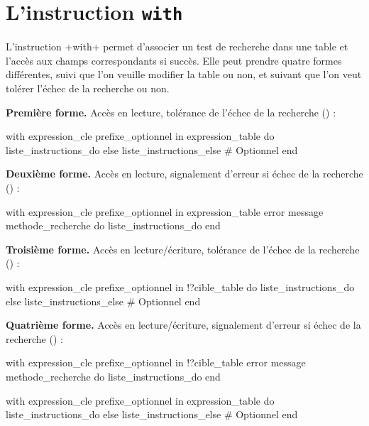 \section{L'instruction \texttt{with}}

L'instruction \ggs+with+ permet d'associer un test de recherche dans une table et l'accès aux champs correspondants si succès. Elle peut prendre quatre formes différentes, suivi que l'on veuille modifier la table ou non, et suivant que l'on veut tolérer l'échec de la recherche ou non.

\textbf{Première forme.} Accès en lecture, tolérance de l'échec de la recherche () :
\begin{galgas}
with expression_cle prefixe_optionnel in expression_table
do
  liste_instructions_do
else
  liste_instructions_else # Optionnel
end
\end{galgas}

\textbf{Deuxième forme.} Accès en lecture, signalement d'erreur si échec de la recherche () :
\begin{galgas}
with expression_cle prefixe_optionnel in expression_table
error message methode_recherche
do
  liste_instructions_do
end
\end{galgas}



\textbf{Troisième forme.} Accès en lecture/écriture, tolérance de l'échec de la recherche () :
\begin{galgas}
with expression_cle prefixe_optionnel in !?cible_table
do
  liste_instructions_do
else
  liste_instructions_else # Optionnel
end
\end{galgas}

\textbf{Quatrième forme.} Accès en lecture/écriture, signalement d'erreur si échec de la recherche () :
\begin{galgas}
with expression_cle prefixe_optionnel in !?cible_table
error message methode_recherche
do
  liste_instructions_do
end
\end{galgas}






\begin{galgas}
with expression_cle prefixe_optionnel in expression_table
do
  liste_instructions_do
else
  liste_instructions_else # Optionnel
end
\end{galgas}

